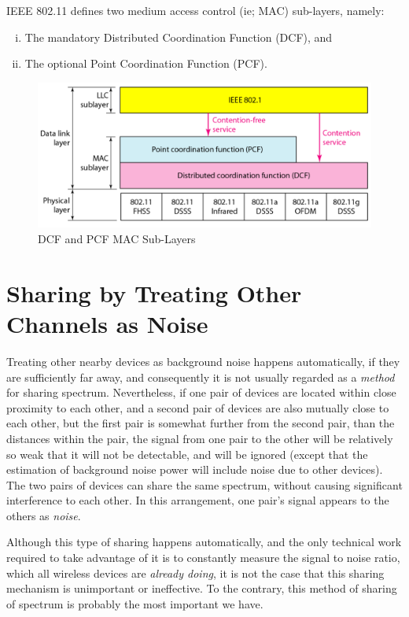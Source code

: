 IEEE 802.11 defines two medium access control (ie; MAC) sub-layers, namely:
\begin{enumerate}[(i)]
\item The mandatory Distributed Coordination Function (DCF), and
\item The optional Point Coordination Function (PCF).
\end{enumerate}

\begin{figure}
\centering
	\includegraphics[width=12cm]{mac_layers.png}
	\caption{DCF and PCF MAC Sub-Layers}
	\label{CSMA_CA}
\end{figure}



\section{Sharing by Treating Other Channels as Noise}\label{sharingasnoise}


Treating other nearby devices as background noise happens automatically, if they are sufficiently far away,
and consequently it is not usually regarded as a {\em method} for sharing spectrum.
Nevertheless, if one pair of devices are located within close proximity to each other,
and a second pair of devices are also mutually close to each other, but the first pair
is somewhat further from the second pair, than the distances within the pair,
the signal from one pair to the other will be relatively so weak that it will not be detectable, and will
be ignored (except that the estimation of background noise power will include noise due to 
other devices). 
The two pairs of devices can share the same spectrum, without causing significant
interference to each other. In this arrangement, one pair's signal appears to the others 
as {\em noise}.

Although this type of sharing happens automatically, and the only technical work required
to take advantage of it is to constantly measure the signal to noise ratio, which all wireless
devices are {\em already doing}, it is not the case that this sharing mechanism is unimportant or
ineffective. To the contrary, this method of sharing of spectrum is probably the most important
we have.

